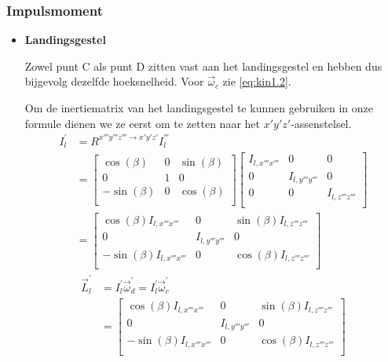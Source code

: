 \subsubsection{Impulsmoment}
\begin{itemize}
\item \textbf{Landingsgestel}

Zowel punt C als punt D zitten vast aan het landingsgestel en hebben dus bijgevolg dezelfde hoeksnelheid. Voor $\vec{\omega}_{c}$ zie \eqref{eq:kin1.2}.

Om de inertiematrix van het landingsgestel te kunnen gebruiken in onze formule dienen we ze eerst om te zetten naar het $x'y'z'$-assenstelsel.
\begin{equation}
\begin{split}
I_{l}^{'}&=R^{x'''y'''z''' \rightarrow x'y'z'}I_{l}^{'''}\\
&=\begin{bmatrix}
\cos(\beta)	&			0			&\sin(\beta)\\
0						&			1			&			0		 \\
-\sin(\beta)&			0			&\cos(\beta)\\
\end{bmatrix}
\begin{bmatrix}
I_{l,x'''x'''}&0&0\\
0&I_{l,y'''y'''}&0\\
0&0&I_{l,z'''z'''}\\
\end{bmatrix}\\
&=\begin{bmatrix}
\cos(\beta)I_{l,x'''x'''}	&			0			&\sin(\beta)I_{l,z'''z'''}\\
0						&			I_{l,y'''y'''}			&			0		 \\
-\sin(\beta)I_{l,x'''x'''}&			0			&\cos(\beta)I_{l,z'''z'''}\\
\end{bmatrix}
\end{split}
\label{eq:dyn2.1}
\end{equation}
\begin{equation}
\begin{split}
\vec{L}_{l}^{'}&=I_{l}^{'}\vec{\omega}_{d}^{'}=I_{l}^{'}\vec{\omega}_{c}^{'}\\
&=\begin{bmatrix}
\cos(\beta)I_{l,x'''x'''}	&			0			&\sin(\beta)I_{l,z'''z'''}\\
0						&			I_{l,y'''y'''}			&			0		 \\
-\sin(\beta)I_{l,x'''x'''}&			0			&\cos(\beta)I_{l,z'''z'''}\\

\end{bmatrix}
\end{split}
\end{equation}
\end{itemize}
